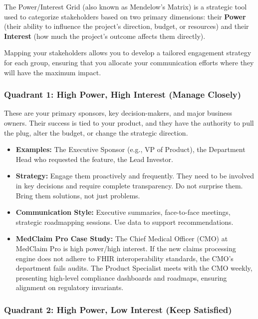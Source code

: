 \documentclass[
  11pt,
  openany,
  oneside]{book}
\providecommand{\tightlist}{%
  \setlength{\itemsep}{0pt}\setlength{\parskip}{0pt}}
\begin{document}
The Power/Interest Grid (also known as Mendelow's Matrix) is a strategic
tool used to categorize stakeholders based on two primary dimensions:
their \textbf{Power} (their ability to influence the project's
direction, budget, or resources) and their \textbf{Interest} (how much
the project's outcome affects them directly).

Mapping your stakeholders allows you to develop a tailored engagement
strategy for each group, ensuring that you allocate your communication
efforts where they will have the maximum impact.

\subsubsection{Quadrant 1: High Power, High Interest (Manage
Closely)}\label{quadrant-1-high-power-high-interest-manage-closely}

These are your primary sponsors, key decision-makers, and major business
owners. Their success is tied to your product, and they have the
authority to pull the plug, alter the budget, or change the strategic
direction.

\begin{itemize}
\tightlist
\item
  \textbf{Examples:} The Executive Sponsor (e.g., VP of Product), the
  Department Head who requested the feature, the Lead Investor.
\item
  \textbf{Strategy:} Engage them proactively and frequently. They need
  to be involved in key decisions and require complete transparency. Do
  not surprise them. Bring them solutions, not just problems.
\item
  \textbf{Communication Style:} Executive summaries, face-to-face
  meetings, strategic roadmapping sessions. Use data to support
  recommendations.
\item
  \textbf{MedClaim Pro Case Study:} The Chief Medical Officer (CMO) at
  MedClaim Pro is high power/high interest. If the new claims processing
  engine does not adhere to FHIR interoperability standards, the CMO's
  department fails audits. The Product Specialist meets with the CMO
  weekly, presenting high-level compliance dashboards and roadmaps,
  ensuring alignment on regulatory invariants.
\end{itemize}

\subsubsection{Quadrant 2: High Power, Low Interest (Keep
Satisfied)}\label{quadrant-2-high-power-low-interest-keep-satisfied}
\end{document}

